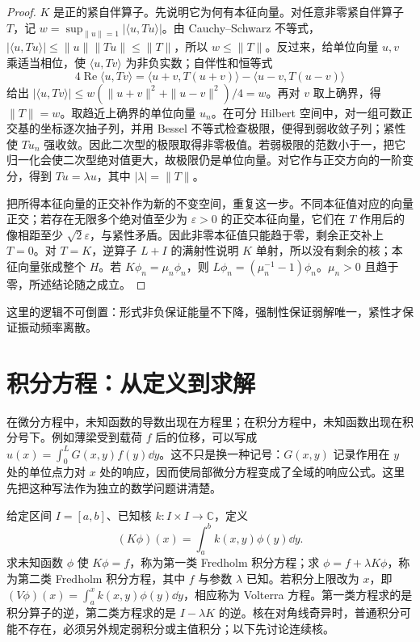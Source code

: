 \begin{proof}
\(K\) 是正的紧自伴算子。先说明它为何有本征向量。对任意非零紧自伴算子 \(T\)，记
\(w=\sup_{\|u\|=1}|\langle u,Tu\rangle|\)。由 Cauchy--Schwarz 不等式，\(|\langle u,Tu\rangle|\le\|u\|\|Tu\|\le\|T\|\)，所以 \(w\le\|T\|\)。反过来，给单位向量 \(u,v\) 乘适当相位，使 \(\langle u,Tv\rangle\) 为非负实数；自伴性和恒等式
\[
4\operatorname{Re}\langle u,Tv\rangle
=\langle u+v,T(u+v)\rangle-\langle u-v,T(u-v)\rangle
\]
给出 \(|\langle u,Tv\rangle|\le w(\|u+v\|^2+\|u-v\|^2)/4=w\)。再对 \(v\) 取上确界，得 \(\|T\|=w\)。取趋近上确界的单位向量 \(u_n\)。在可分 Hilbert 空间中，对一组可数正交基的坐标逐次抽子列，并用 Bessel 不等式检查极限，便得到弱收敛子列；紧性使 \(Tu_n\) 强收敛。因此二次型的极限取得非零极值。若弱极限的范数小于一，把它归一化会使二次型绝对值更大，故极限仍是单位向量。对它作与正交方向的一阶变分，得到 \(Tu=\lambda u\)，其中 \(|\lambda|=\|T\|\)。

把所得本征向量的正交补作为新的不变空间，重复这一步。不同本征值对应的向量正交；若存在无限多个绝对值至少为 \(\varepsilon>0\) 的正交本征向量，它们在 \(T\) 作用后的像相距至少 \(\sqrt2\varepsilon\)，与紧性矛盾。因此非零本征值只能趋于零，剩余正交补上 \(T=0\)。对 \(T=K\)，逆算子 \(L+I\) 的满射性说明 \(K\) 单射，所以没有剩余的核；本征向量张成整个 \(H\)。若 \(K\phi_n=\mu_n\phi_n\)，则
\(L\phi_n=(\mu_n^{-1}-1)\phi_n\)。\(\mu_n>0\) 且趋于零，所述结论随之成立。
\end{proof}

这里的逻辑不可倒置：形式非负保证能量不下降，强制性保证弱解唯一，紧性才保证振动频率离散。

\section{积分方程：从定义到求解}
\label{sec:advanced-integral-equations}

在微分方程中，未知函数的导数出现在方程里；在积分方程中，未知函数出现在积分号下。例如薄梁受到载荷 $f$ 后的位移，可以写成 $u(x)=\int_0^L G(x,y)f(y)\dd y$。这不只是换一种记号：$G(x,y)$ 记录作用在 $y$ 处的单位点力对 $x$ 处的响应，因而使局部微分方程变成了全域的响应公式。这里先把这种写法作为独立的数学问题讲清楚。

\begin{definition}[积分算子与积分方程]
给定区间 $I=[a,b]$、已知核 $k:I\times I\to\mathbb C$，定义
\[
(K\phi)(x)=\int_a^b k(x,y)\phi(y)\dd y.
\]
求未知函数 $\phi$ 使 $K\phi=f$，称为第一类 Fredholm 积分方程；求 $\phi=f+\lambda K\phi$，称为第二类 Fredholm 积分方程，其中 $f$ 与参数 $\lambda$ 已知。若积分上限改为 $x$，即 $(V\phi)(x)=\int_a^x k(x,y)\phi(y)\dd y$，相应称为 Volterra 方程。第一类方程求的是积分算子的逆，第二类方程求的是 $I-\lambda K$ 的逆。核在对角线奇异时，普通积分可能不存在，必须另外规定弱积分或主值积分；以下先讨论连续核。
\end{definition}

